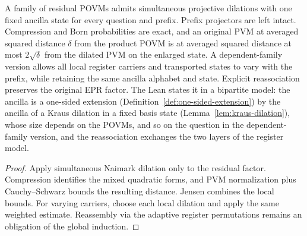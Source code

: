 \begin{lemma}
\label{lem:intro-conditional-dilation}
\leanok
A family of residual POVMs admits simultaneous projective dilations with
one fixed ancilla state for every question and prefix. Prefix projectors are
left intact. Compression and Born probabilities are exact, and an original
PVM at averaged squared distance $\delta$ from the product POVM is at averaged
squared distance at most $2\sqrt{\delta}$ from the dilated PVM on the enlarged
state. A dependent-family version allows all local register carriers and
transported states to vary with the prefix, while retaining the same ancilla
alphabet and state. Explicit reassociation preserves the original EPR factor.
The Lean states it in a bipartite model: the ancilla is a one-sided extension
(Definition~\ref{def:one-sided-extension}) by the ancilla of a Kraus dilation in a fixed basis
state (Lemma~\ref{lem:kraus-dilation}), whose size depends on the POVMs, and so on the question in
the dependent-family version, and the reassociation exchanges the two layers of the register model.
\end{lemma}
\begin{proof}
\leanok
Apply simultaneous Naimark dilation only to the residual factor. Compression
identifies the mixed quadratic forms, and PVM normalization plus
Cauchy--Schwarz bounds the resulting distance. Jensen combines the local
bounds. For varying carriers, choose each local dilation and apply the same
weighted estimate. Reassembly via the adaptive register permutations remains
an obligation of the global induction.
\end{proof}

